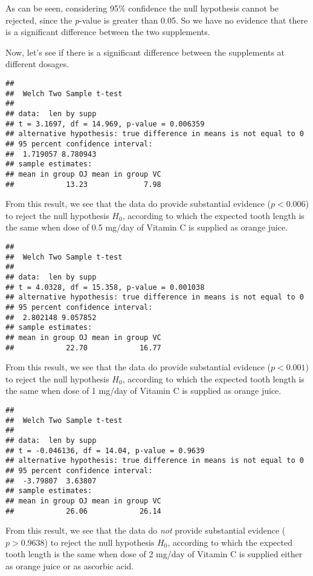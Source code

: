 \documentclass[
]{article}
\begin{document}
As can be seen, considering 95\% confidence the null hypothesis cannot
be rejected, since the \emph{p}-value is greater than 0.05. So we have
no evidence that there is a significant difference between the two
supplements.

Now, let's see if there is a significant difference between the
supplements at different dosages.

\begin{verbatim}
## 
##  Welch Two Sample t-test
## 
## data:  len by supp
## t = 3.1697, df = 14.969, p-value = 0.006359
## alternative hypothesis: true difference in means is not equal to 0
## 95 percent confidence interval:
##  1.719057 8.780943
## sample estimates:
## mean in group OJ mean in group VC 
##            13.23             7.98
\end{verbatim}

From this result, we see that the data do provide substantial evidence
(\(p < 0.006\)) to reject the null hypothesis \(H_0\), according to
which the expected tooth length is the same when dose of 0.5 mg/day of
Vitamin C is supplied as orange juice.

\begin{verbatim}
## 
##  Welch Two Sample t-test
## 
## data:  len by supp
## t = 4.0328, df = 15.358, p-value = 0.001038
## alternative hypothesis: true difference in means is not equal to 0
## 95 percent confidence interval:
##  2.802148 9.057852
## sample estimates:
## mean in group OJ mean in group VC 
##            22.70            16.77
\end{verbatim}

From this result, we see that the data do provide substantial evidence
(\(p < 0.001\)) to reject the null hypothesis \(H_0\), according to
which the expected tooth length is the same when dose of 1 mg/day of
Vitamin C is supplied as orange juice.

\begin{verbatim}
## 
##  Welch Two Sample t-test
## 
## data:  len by supp
## t = -0.046136, df = 14.04, p-value = 0.9639
## alternative hypothesis: true difference in means is not equal to 0
## 95 percent confidence interval:
##  -3.79807  3.63807
## sample estimates:
## mean in group OJ mean in group VC 
##            26.06            26.14
\end{verbatim}

From this result, we see that the data do \emph{not} provide substantial
evidence (\(p > 0.9638\)) to reject the null hypothesis \(H_0\),
according to which the expected tooth length is the same when dose of 2
mg/day of Vitamin C is supplied either as orange juice or as ascorbic
acid.
\end{document}
